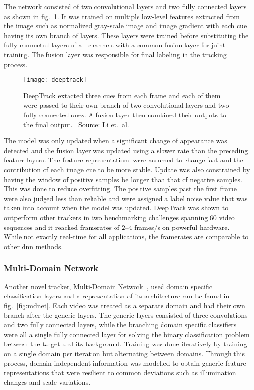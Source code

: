 The network consisted of two convolutional layers and two fully connected layers as shown in fig.~\ref{fig:deeptrack}. It was trained on multiple low-level features extracted from the image such as normalized gray-scale image and image gradient with each cue having its own branch of layers. These layers were trained before substituting the fully connected layers of all channels with a common fusion layer for joint training. The fusion layer was responsible for final labeling in the tracking process.~\cite{DEEPTRACK}

\begin{figure}[H]
\centering
\texttt{[image: deeptrack]}
\caption{DeepTrack extacted three cues from each frame and each of them were passed to their own branch of two convolutional layers and two fully connected ones. A fusion layer then combined their outputs to the final output.~\cite{DEEPTRACK} Source: Li et.~al.~\cite{DEEPTRACK}}\label{fig:deeptrack}
\end{figure}

The model was only updated when a significant change of appearance was detected and the fusion layer was updated using a slower rate than the preceding feature layers. The feature representations were assumed to change fast and the contribution of each image cue to be more stable. Update was also constrained by having the window of positive samples be longer than that of negative samples. This was done to reduce overfitting. The positive samples past the first frame were also judged less than reliable and were assigned a label noise value that was taken into account when the model was updated. DeepTrack was shown to outperform other trackers in two benchmarking challenges spanning 60 video sequences and it reached framerates of 2--4 frames/s on powerful hardware.~\cite{DEEPTRACK} While not exactly real-time for all applications, the framerates are comparable to other \ac{dnn} methods.

\subsubsection{Multi-Domain Network}\label{sssec:mdn}
Another novel tracker, Multi-Domain Network~\cite{MDNET}, used domain specific classification layers and a representation of its architecture can be found in fig.~\ref{fig:mdnet}. Each video was treated as a separate domain and had their own branch after the generic layers. The generic layers consisted of three convolutions and two fully connected layers, while the branching domain specific classifiers were all a single fully connected layer for solving the binary classification problem between the target and its background. Training was done iteratively by training on a single domain per iteration but alternating between domains. Through this process, domain independent information was modelled to obtain generic feature representations that were resilient to common deviations such as illumination changes and scale variations.~\cite{MDNET}

